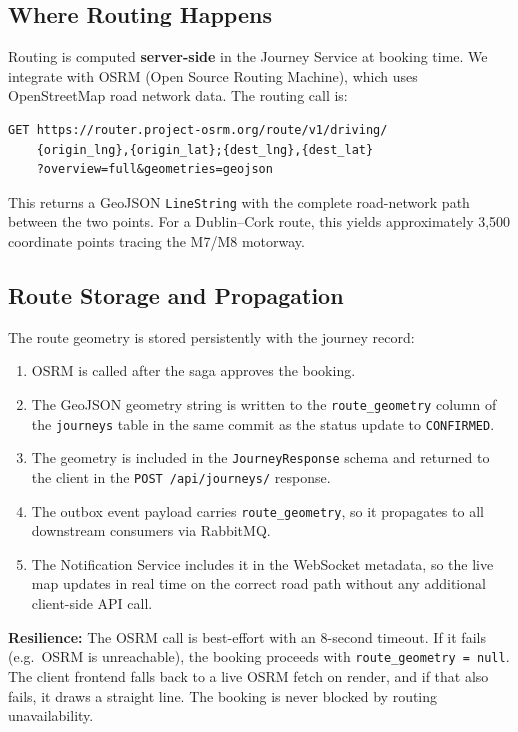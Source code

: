 \documentclass[12pt,a4paper]{article}
\begin{document}
\subsection{Where Routing Happens}

Routing is computed \textbf{server-side} in the Journey Service at booking time. We integrate with OSRM (Open Source Routing Machine), which uses OpenStreetMap road network data. The routing call is:

\begin{lstlisting}
GET https://router.project-osrm.org/route/v1/driving/
    {origin_lng},{origin_lat};{dest_lng},{dest_lat}
    ?overview=full&geometries=geojson
\end{lstlisting}

This returns a GeoJSON \texttt{LineString} with the complete road-network path between the two points. For a Dublin--Cork route, this yields approximately 3,500 coordinate points tracing the M7/M8 motorway.

\subsection{Route Storage and Propagation}

The route geometry is stored persistently with the journey record:

\begin{enumerate}[leftmargin=*]
  \item OSRM is called after the saga approves the booking.
  \item The GeoJSON geometry string is written to the \texttt{route\_geometry} column of the \texttt{journeys} table in the same commit as the status update to \texttt{CONFIRMED}.
  \item The geometry is included in the \texttt{JourneyResponse} schema and returned to the client in the \texttt{POST /api/journeys/} response.
  \item The outbox event payload carries \texttt{route\_geometry}, so it propagates to all downstream consumers via RabbitMQ.
  \item The Notification Service includes it in the WebSocket metadata, so the live map updates in real time on the correct road path without any additional client-side API call.
\end{enumerate}

\textbf{Resilience:} The OSRM call is best-effort with an 8-second timeout. If it fails (e.g.\ OSRM is unreachable), the booking proceeds with \texttt{route\_geometry = null}. The client frontend falls back to a live OSRM fetch on render, and if that also fails, it draws a straight line. The booking is never blocked by routing unavailability.
\end{document}
